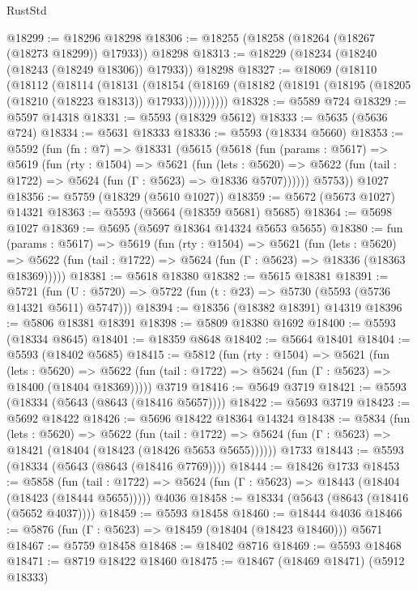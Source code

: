 \begin{lexlean}{RustStd}
\begin{coremodule}
@18299 := @18296 @18298
@18306 := @18255 (@18258 (@18264 (@18267 (@18273 @18299)) @17933)) @18298
@18313 := @18229 (@18234 (@18240 (@18243 (@18249 @18306)) @17933)) @18298
@18327 := @18069
    (@18110
      (@18112
        (@18114
          (@18131
            (@18154
              (@18169 (@18182 (@18191 (@18195 (@18205 (@18210 (@18223 @18313)) @17933))))))))))
@18328 := @5589 @724
@18329 := @5597 @14318
@18331 := @5593 (@18329 @5612)
@18333 := @5635 (@5636 @724)
@18334 := @5631 @18333
@18336 := @5593 (@18334 @5660)
@18353 := @5592
    (fun (fn : @7) =>
    @18331
      (@5615
        (@5618
          (fun (params : @5617) =>
          @5619
            (fun (rty : @1504) =>
            @5621
              (fun (lets : @5620) =>
              @5622 (fun (tail : @1722) => @5624 (fun (Γ : @5623) => @18336 @5707))))))
        @5753))
    @1027
@18356 := @5759 (@18329 (@5610 @1027))
@18359 := @5672 (@5673 @1027) @14321
@18363 := @5593 (@5664 (@18359 @5681) @5685)
@18364 := @5698 @1027
@18369 := @5695 (@5697 @18364 @14324 @5653 @5655)
@18380 := fun (params : @5617) =>
  @5619
    (fun (rty : @1504) =>
    @5621
      (fun (lets : @5620) =>
      @5622 (fun (tail : @1722) => @5624 (fun (Γ : @5623) => @18336 (@18363 @18369)))))
@18381 := @5618 @18380
@18382 := @5615 @18381
@18391 := @5721
    (fun (U : @5720) => @5722 (fun (t : @23) => @5730 (@5593 (@5736 @14321 @5611) @5747)))
@18394 := @18356 (@18382 @18391) @14319
@18396 := @5806 @18381 @18391
@18398 := @5809 @18380 @1692
@18400 := @5593 (@18334 @8645)
@18401 := @18359 @8648
@18402 := @5664 @18401
@18404 := @5593 (@18402 @5685)
@18415 := @5812
    (fun (rty : @1504) =>
    @5621
      (fun (lets : @5620) =>
      @5622 (fun (tail : @1722) => @5624 (fun (Γ : @5623) => @18400 (@18404 @18369)))))
    @3719
@18416 := @5649 @3719
@18421 := @5593 (@18334 (@5643 (@8643 (@18416 @5657))))
@18422 := @5693 @3719
@18423 := @5692 @18422
@18426 := @5696 @18422 @18364 @14324
@18438 := @5834
    (fun (lets : @5620) =>
    @5622
      (fun (tail : @1722) =>
      @5624 (fun (Γ : @5623) => @18421 (@18404 (@18423 (@18426 @5653 @5655))))))
    @1733
@18443 := @5593 (@18334 (@5643 (@8643 (@18416 @7769))))
@18444 := @18426 @1733
@18453 := @5858
    (fun (tail : @1722) => @5624 (fun (Γ : @5623) => @18443 (@18404 (@18423 (@18444 @5655)))))
    @4036
@18458 := @18334 (@5643 (@8643 (@18416 (@5652 @4037))))
@18459 := @5593 @18458
@18460 := @18444 @4036
@18466 := @5876 (fun (Γ : @5623) => @18459 (@18404 (@18423 @18460))) @5671
@18467 := @5759 @18458
@18468 := @18402 @8716
@18469 := @5593 @18468
@18471 := @8719 @18422 @18460
@18475 := @18467 (@18469 @18471) (@5912 @18333)

\end{coremodule}
\end{lexlean}
